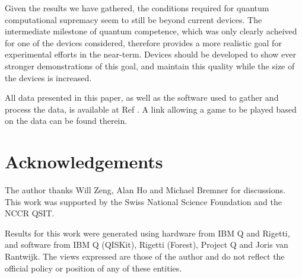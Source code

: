 \documentclass[aps,prl,twocolumn,showpacs,preprintnumbers]{revtex4-1}
\begin{document}
Given the results we have gathered, the conditions required for quantum computational supremacy seem to still be beyond current devices. The intermediate milestone of quantum competence, which was only clearly acheived for one of the devices considered, therefore provides a more realistic goal for experimental efforts in the near-term. Devices should be developed to show ever stronger demonstrations of this goal, and maintain this quality while the size of the devices is increased.

All data presented in this paper, as well as the software used to gather and process the data, is available at Ref \cite{awesomeness}. A link allowing a game to be played based on the data can be found therein.


\section{Acknowledgements}

The author thanks Will Zeng, Alan Ho and Michael Bremner for discussions. This work was supported by the Swiss National Science Foundation and the NCCR QSIT.

Results for this work were generated using hardware from IBM Q and Rigetti, and software from IBM Q (QISKit), Rigetti (Forest), Project Q and Joris van Rantwijk. The views expressed are those of the author and do not reflect the official policy or position of any of these entities.





\pagebreak
\end{document}
